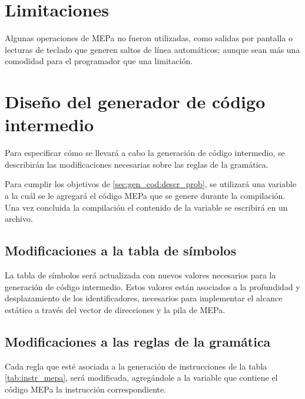 \section{Limitaciones}
Algunas operaciones de MEPa no fueron utilizadas, como salidas por pantalla o lecturas de teclado que generen saltos de línea automáticos; aunque sean más una comodidad para el programador que una limitación. 

\section{Diseño del generador de código intermedio}
Para especificar cómo se llevará a cabo la generación de código intermedio, se describirán las modificaciones necesarias sobre las reglas de la gramática.

Para cumplir los objetivos de \ref{sec:gen_cod:descr_prob}, se utilizará una variable a la cuál se le agregará el código MEPa que se genere durante la compilación. Una vez concluida la compilación el contenido de la variable se escribirá en un archivo.

\subsection{Modificaciones a la tabla de símbolos}
\label{sec:gen_cod:mod_tab_sim}
La tabla de símbolos será actualizada con nuevos valores necesarios para la generación de código intermedio. Estos valores están asociados a la profundidad y desplazamiento de los identificadores, necesarios para implementar el alcance estático a través del vector de direcciones y la pila de MEPa.

\subsection{Modificaciones a las reglas de la gramática}
Cada regla que esté asociada a la generación de instrucciones de la tabla \ref{tab:instr_mepa}, será modificada, agregándole a la variable que contiene el código MEPa la instrucción correspondiente.

